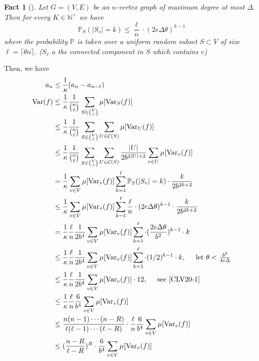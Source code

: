 \documentclass{article}
\newtheorem{fact}{Fact}[section]
\def\Var{\mathrm{Var}}
\begin{document}
\begin{fact}[\cite{CLV20-1}]
  Let $G = (V, E)$ be an $n$-vertex graph of maximum degree at most $\Delta$.
  Then for every $K\in \mathbb{N}^+$ we have
  \[\mathbb{P}_S(|S_v| = k) \leq \frac{\ell}{n} \cdot (2e\Delta\theta)^{k-1}\]
  where the probability $\mathbb{P}$ is taken over a uniform random subset $S\subset V$ of size $\ell = \lceil\theta n\rceil$. ($S_v$ a the connected component in $S$ which contains $v$)
\end{fact}

Then, we have
\begin{align*}
  a_n &\leq \frac{1}{\kappa} (a_n - a_{n-\ell}) \\
  \Var(f) &\leq \frac{1}{\kappa} \frac{1}{\binom{n}{\ell}} \sum_{S\in\binom{V}{\ell}} \mu[\Var_S(f)] \\
      &\leq \frac{1}{\kappa}\frac{1}{\binom{n}{\ell}} \sum_{S\in\binom{V}{\ell}} \sum_{U\in\mathcal{C}(S)}\mu[\Var_U(f)] \\
      &\leq \frac{1}{\kappa}\frac{1}{\binom{n}{\ell}} \sum_{S\in\binom{V}{\ell}} \sum_{U\in\mathcal{C}(S)} \frac{|U|}{2b^{2|U|+2}}\sum_{v\in U} \mu[\Var_v(f)] \\
      &= \frac{1}{\kappa} \sum_{v\in V} \mu[\Var_v(f)] \sum_{k=1}^\ell \mathbb{P}_S(|S_v| = k) \cdot \frac{k}{2b^{2k + 2}} \\
  &\leq \frac{1}{\kappa} \sum_{v\in V} \mu[\Var_v(f)] \sum_{k=1}^\ell\frac{\ell}{n}\cdot (2e\Delta\theta)^{k-1} \cdot \frac{k}{2b^{2k+2}}  \\
  &= \frac{1}{\kappa}\frac{\ell}{n}\frac{1}{2b^4} \sum_{v\in V} \mu[\Var_v(f)] \sum_{k=1}^\ell\cdot (\frac{2e\Delta\theta}{b^2})^{k-1} \cdot k  \\
  &\leq \frac{1}{\kappa}\frac{\ell}{n}\frac{1}{2b^4} \sum_{v\in V} \mu[\Var_v(f)] \sum_{k=1}^\ell\cdot (1/2)^{k-1} \cdot k  ,\hspace{0.5cm} \mbox{let $\theta < \frac{b^2}{4e\Delta}$}\\
  &\leq \frac{1}{\kappa}\frac{\ell}{n}\frac{1}{2b^4} \sum_{v\in V} \mu[\Var_v(f)] \cdot 12 ,\hspace{0.5cm} \mbox{see \cite{CLV20-1}} \\
  &\leq \frac{1}{\kappa}\frac{\ell}{n}\frac{6}{b^4} \sum_{v\in V} \mu[\Var_v(f)] \\
      &\leq \frac{n(n-1)\cdots(n-R)}{\ell(\ell-1)\cdots(\ell-R)} \cdot \frac{\ell}{n}\frac{6}{b^4}\sum_{v\in V}\mu[\Var_v(f)] \\
  &\leq (\frac{n-R}{\ell-R})^R \cdot \frac{6}{b^4}\sum_{v\in V}\mu[\Var_v(f)] \\

\end{align*}
\end{document}
